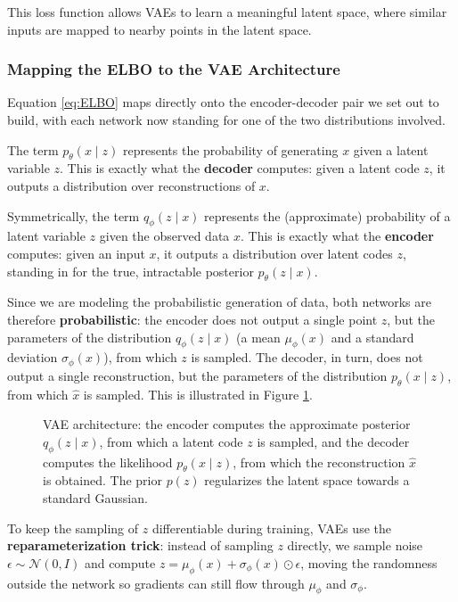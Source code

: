 This loss function allows VAEs to learn a meaningful latent space, where similar inputs are mapped to nearby points in the latent space.

\subsubsection{Mapping the ELBO to the VAE Architecture}
Equation \ref{eq:ELBO} maps directly onto the encoder-decoder pair we set out to build, with each network now standing for one of the two distributions involved.

The term $p_\theta(x \mid z)$ represents the probability of generating $x$ given a latent variable $z$. This is exactly what the \textbf{decoder} computes: given a latent code $z$, it outputs a distribution over reconstructions of $x$.

Symmetrically, the term $q_\phi(z \mid x)$ represents the (approximate) probability of a latent variable $z$ given the observed data $x$. This is exactly what the \textbf{encoder} computes: given an input $x$, it outputs a distribution over latent codes $z$, standing in for the true, intractable posterior $p_\theta(z \mid x)$.

Since we are modeling the probabilistic generation of data, both networks are therefore \textbf{probabilistic}: the encoder does not output a single point $z$, but the parameters of the distribution $q_\phi(z \mid x)$ (a mean $\mu_\phi(x)$ and a standard deviation $\sigma_\phi(x)$), from which $z$ is sampled. The decoder, in turn, does not output a single reconstruction, but the parameters of the distribution $p_\theta(x \mid z)$, from which $\hat{x}$ is sampled. This is illustrated in Figure \ref{fig:vae-architecture}.

\begin{figure}[H]
    \centering
    \resizebox{0.5\textwidth}{!}{}
    \caption{VAE architecture: the encoder computes the approximate posterior $q_\phi(z \mid x)$, from which a latent code $z$ is sampled, and the decoder computes the likelihood $p_\theta(x \mid z)$, from which the reconstruction $\hat{x}$ is obtained. The prior $p(z)$ regularizes the latent space towards a standard Gaussian.}
    \label{fig:vae-architecture}
\end{figure}

To keep the sampling of $z$ differentiable during training, VAEs use the \textbf{reparameterization trick}: instead of sampling $z$ directly, we sample noise $\epsilon \sim \mathcal{N}(0, I)$ and compute $z = \mu_\phi(x) + \sigma_\phi(x) \odot \epsilon$, moving the randomness outside the network so gradients can still flow through $\mu_\phi$ and $\sigma_\phi$.

